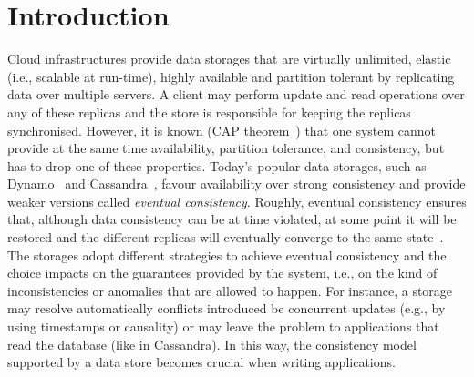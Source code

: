 
\section{Introduction}

Cloud infrastructures provide data storages that are virtually unlimited, elastic (i.e., scalable at run-time), 
highly available and partition tolerant by 
replicating data over multiple servers. A client may  perform update and 
read operations over any of these replicas and the  store is responsible for keeping 
the  replicas synchronised. 
However, it is known (CAP theorem~\cite{CAP}) that one system cannot provide at the same time availability, 
partition tolerance, and consistency, but has to drop one of these properties. Today's popular 
data storages, such as Dynamo~\cite{DeCandia:2007:DAH:1294261.1294281} and  Cassandra~\cite{lakshman2010cassandra}, favour 
availability over strong consistency and provide weaker versions called \emph{eventual consistency}.
Roughly, eventual consistency ensures that, although data consistency can be at time violated, at some point it will be restored
and the different replicas will eventually converge to the same state~\cite{DBLP:journals/cacm/BailisG13}.
The  storages adopt different strategies to achieve eventual consistency and the choice  
impacts on the  guarantees provided by the system, i.e., on the kind of 
inconsistencies or anomalies that are allowed to happen. For instance, a storage may
resolve automatically conflicts introduced be concurrent updates (e.g., by using timestamps or causality) or  
may leave the problem to applications that read the database (like in Cassandra).
In this way, the consistency model supported by a data store becomes crucial when writing applications. 

